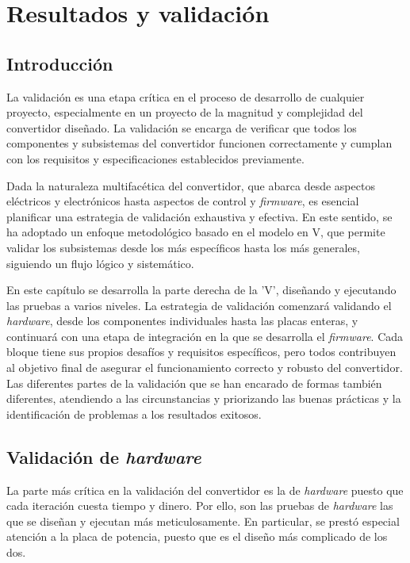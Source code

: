 \chapter{Resultados y validación}

\section{Introducción}
La validación es una etapa crítica en el proceso de desarrollo de cualquier proyecto, especialmente en un proyecto de la magnitud y complejidad del convertidor diseñado. La validación se encarga de verificar que todos los componentes y subsistemas del convertidor funcionen correctamente y cumplan con los requisitos y especificaciones establecidos previamente.

Dada la naturaleza multifacética del convertidor, que abarca desde aspectos eléctricos y electrónicos hasta aspectos de control y \textit{firmware}, es esencial planificar una estrategia de validación exhaustiva y efectiva. En este sentido, se ha adoptado un enfoque metodológico basado en el modelo en V, que permite validar los subsistemas desde los más específicos hasta los más generales, siguiendo un flujo lógico y sistemático. 

En este capítulo se desarrolla la parte derecha de la 'V', diseñando y ejecutando las pruebas a varios niveles. La estrategia de validación comenzará validando el \textit{hardware}, desde los componentes individuales hasta las placas enteras, y continuará con una etapa de integración en la que se desarrolla el \textit{firmware}. Cada bloque tiene sus propios desafíos y requisitos específicos, pero todos contribuyen al objetivo final de asegurar el funcionamiento correcto y robusto del convertidor. Las diferentes partes de la validación que se han encarado de formas también diferentes, atendiendo a las circunstancias y priorizando las buenas prácticas y la identificación de problemas a los resultados exitosos.

\section{Validación de \textit{hardware}}

La parte más crítica en la validación del convertidor es la de \textit{hardware} puesto que cada iteración cuesta tiempo y dinero. Por ello, son las pruebas de \textit{hardware} las que se diseñan y ejecutan más meticulosamente. En particular, se prestó especial atención a la placa de potencia, puesto que es el diseño más complicado de los dos.

